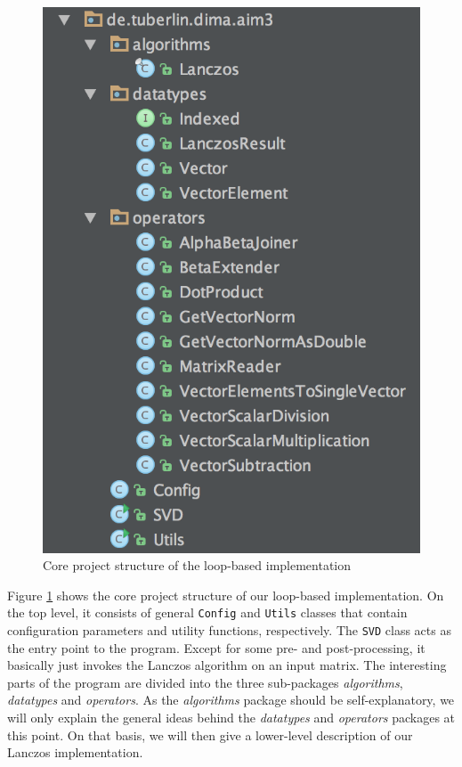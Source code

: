 \begin{figure}[h]
	\centering
	\includegraphics[scale=0.5]{images/loop_approach_project_structure}
    \caption{Core project structure of the loop-based implementation}
	\label{fig:loop_project_structure}
\end{figure}

Figure \ref{fig:loop_project_structure} shows the core project structure of our
loop-based implementation. On the top level, it consists of general
\texttt{Config} and \texttt{Utils} classes that contain configuration
parameters and utility functions, respectively. The \texttt{SVD} class acts as
the entry point to the program. Except for some pre- and post-processing, it
basically just invokes the Lanczos algorithm on an input matrix. The
interesting parts of the program are divided into the three sub-packages
\textit{algorithms}, \textit{datatypes} and \textit{operators}. As the
\textit{algorithms} package should be self-explanatory, we will only explain
the general ideas behind the \textit{datatypes} and  \textit{operators}
packages at this point. On that basis, we will then give a lower-level
description of our Lanczos implementation.

